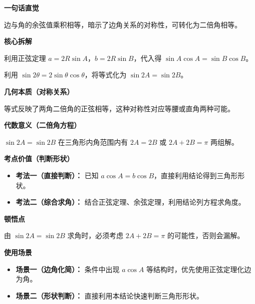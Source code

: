 \begin{explanationbox}
	\textbf{\textcolor{CExplanation}{一句话直觉}}

	边与角的余弦值乘积相等，暗示了边角关系的对称性，可转化为二倍角相等。

	\medskip
	\textbf{\textcolor{CExplanation}{核心拆解}}
	\begin{description}[style=nextline, leftmargin=2.8em, labelsep=0.5em, itemsep=0.45em]
		\item[\textbf{要点一（正弦定理化）：}] 利用正弦定理 $a=2R\sin A$，$b=2R\sin B$，代入得 $\sin A\cos A = \sin B\cos B$。
		\item[\textbf{要点二（二倍角公式）：}] 利用 $\sin 2\theta = 2\sin\theta\cos\theta$，将等式化为 $\sin 2A = \sin 2B$。
	\end{description}

	\medskip
	\textbf{\textcolor{CExplanation}{几何本质（对称关系）}}

	等式反映了两角二倍角的正弦相等，这种对称性对应等腰或直角两种可能。

	\medskip
	\textbf{\textcolor{CExplanation}{代数意义（二倍角方程）}}

	$\sin 2A = \sin 2B$ 在三角形内角范围内有 $2A=2B$ 或 $2A+2B=\pi$ 两组解。

	\medskip
	\textbf{\textcolor{CExplanation}{考点价值（判断形状）}}
	\begin{itemize}[leftmargin=*, itemsep=0.5em, topsep=0.4em]
		\item \textbf{考法一（直接判断）：} 已知 $a\cos A = b\cos B$，直接利用结论得到三角形形状。
		\item \textbf{考法二（综合求角）：} 结合正弦定理、余弦定理，利用结论列方程求角度。
	\end{itemize}

	\medskip
	\textbf{\textcolor{CExplanation}{顿悟点}}

	由 $\sin 2A = \sin 2B$ 求角时，必须考虑 $2A+2B=\pi$ 的可能性，否则会漏解。

	\medskip
	\textbf{\textcolor{CExplanation}{使用场景}}
	\begin{itemize}[leftmargin=*, itemsep=0.5em, topsep=0.4em]
		\item \textbf{场景一（边角化简）：} 条件中出现 $a\cos A$ 等结构时，优先使用正弦定理化边为角。
		\item \textbf{场景二（形状判断）：} 直接利用本结论快速判断三角形形状。
	\end{itemize}
\end{explanationbox}
